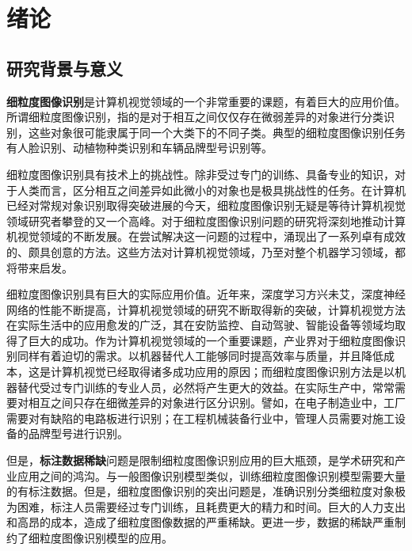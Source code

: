 
\chapter{绪论}

\section{研究背景与意义}
\textbf{细粒度图像识别}是计算机视觉领域的一个非常重要的课题，有着巨大的应用价值。所谓细粒度图像识别，指的是对于相互之间仅仅存在微弱差异的对象进行分类识别，这些对象很可能隶属于同一个大类下的不同子类。典型的细粒度图像识别任务有人脸识别、动植物种类识别和车辆品牌型号识别等。


细粒度图像识别具有技术上的挑战性。除非受过专门的训练、具备专业的知识，对于人类而言，区分相互之间差异如此微小的对象也是极具挑战性的任务。在计算机已经对常规对象识别取得突破进展的今天，细粒度图像识别无疑是等待计算机视觉领域研究者攀登的又一个高峰。对于细粒度图像识别问题的研究将深刻地推动计算机视觉领域的不断发展。在尝试解决这一问题的过程中，涌现出了一系列卓有成效的、颇具创意的方法\cite{zhang2014part, lin2015bilinear,gao2016compact, dubey2018maximum-entropy}。这些方法对计算机视觉领域，乃至对整个机器学习领域，都将带来启发。

细粒度图像识别具有巨大的实际应用价值。近年来，深度学习方兴未艾，深度神经网络的性能不断提高\cite{krizhevsky2012imagenet, simonyan2014very, szegedy2015going, szegedy2016rethinking, he2016deep}，计算机视觉领域的研究不断取得新的突破，计算机视觉方法在实际生活中的应用愈发的广泛，其在安防监控、自动驾驶、智能设备等领域均取得了巨大的成功。作为计算机视觉领域的一个重要课题，产业界对于细粒度图像识别同样有着迫切的需求。以机器替代人工能够同时提高效率与质量，并且降低成本，这是计算机视觉已经取得诸多成功应用的原因；而细粒度图像识别方法是以机器替代受过专门训练的专业人员，必然将产生更大的效益。在实际生产中，常常需要对相互之间只存在细微差异的对象进行区分识别。譬如，在电子制造业中，工厂需要对有缺陷的电路板进行识别；在工程机械装备行业中，管理人员需要对施工设备的品牌型号进行识别。

但是，\textbf{标注数据稀缺}问题是限制细粒度图像识别应用的巨大瓶颈，是学术研究和产业应用之间的鸿沟。与一般图像识别模型类似，训练细粒度图像识别模型需要大量的有标注数据。但是，细粒度图像识别的突出问题是，准确识别分类细粒度对象极为困难，标注人员需要经过专门训练，且耗费更大的精力和时间。巨大的人力支出和高昂的成本，造成了细粒度图像数据的严重稀缺。更进一步，数据的稀缺严重制约了细粒度图像识别模型的应用。

